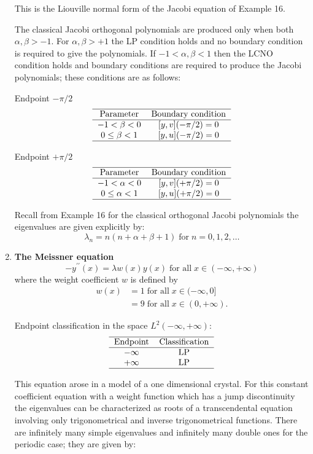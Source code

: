 \documentclass[12pt]{amsart}%
\theoremstyle{plain}
\numberwithin{equation}{section}
\begin{document}
\begin{enumerate}
This is the Liouville normal form of the Jacobi equation of Example 16.

The classical Jacobi orthogonal polynomials are produced only when both
$\alpha,\beta>-1.$ For $\alpha,\beta>+1$ the LP condition holds and no
boundary condition is required to give the polynomials. If $-1<\alpha,\beta<1$
then the LCNO condition holds and boundary conditions are required to produce
the Jacobi polynomials; these conditions are as follows:

Endpoint $-\pi/2$%
\[%
\begin{tabular}
[c]{cc}\hline
Parameter & Boundary condition\\\hline
$-1<\beta<0$ & $[y,v](-\pi/2)=0$\\
$0\leq\beta<1$ & $[y,u](-\pi/2)=0$\\\hline
\end{tabular}
\]

Endpoint $+\pi/2$%
\[%
\begin{tabular}
[c]{cc}\hline
Parameter & Boundary condition\\\hline
$-1<\alpha<0$ & $[y,v](+\pi/2)=0$\\
$0\leq\alpha<1$ & $[y,u](+\pi/2)=0$\\\hline
\end{tabular}
\]

Recall from Example 16 for the classical orthogonal Jacobi polynomials the
eigenvalues are given explicitly by:%
\[
\lambda_{n}=n(n+\alpha+\beta+1)\;\text{for}\;n=0,1,2,\ldots
\]

\item \textbf{The Meissner equation}%
\[
-y^{\prime\prime}(x)=\lambda w(x)y(x)\;\text{for all}\;x\in(-\infty,+\infty)
\]
where the weight coefficient $w$ is defined by%
\begin{align*}
w(x)  &  =1\;\text{for all}\;x\in(-\infty,0]\\
&  =9\;\text{for all}\;x\in(0,+\infty).
\end{align*}

Endpoint classification in the space $L^{2}(-\infty,+\infty)$:%
\[%
\begin{tabular}
[c]{cc}\hline
Endpoint & Classification\\\hline
$-\infty$ & LP\\
$+\infty$ & LP\\\hline
\end{tabular}
\]

This equation arose in a model of a one dimensional crystal. For this constant
coefficient equation with a weight function which has a jump discontinuity the
eigenvalues can be characterized as roots of a transcendental equation
involving only trigonometrical and inverse trigonometrical functions. There
are infinitely many simple eigenvalues and infinitely many double ones for the
periodic case; they are given by:


\end{enumerate}
\end{document}
